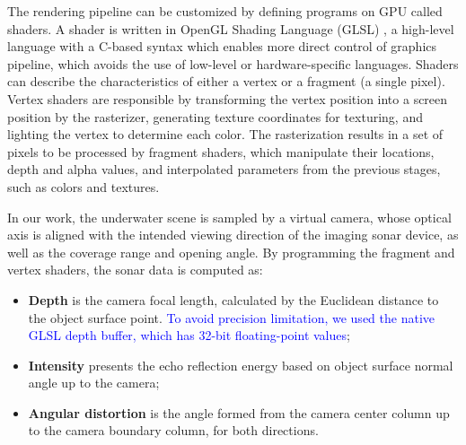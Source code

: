 \documentclass[final,5p,times]{elsarticle}
\begin{document}
The rendering pipeline can be customized by defining programs on GPU called
shaders. A shader is written in OpenGL Shading Language (GLSL) \cite{rost2009}, a high-level language with a C-based syntax which enables more direct control of graphics pipeline, which avoids the use of low-level or hardware-specific languages. Shaders can describe the characteristics of either a vertex or a fragment (a single pixel). Vertex shaders are responsible by transforming the vertex position into a screen position by the rasterizer, generating texture coordinates for texturing, and lighting the vertex to determine each color. The rasterization results in a set of pixels to be processed by fragment shaders, which manipulate their locations, depth and alpha values, and interpolated parameters from the previous stages, such as colors and textures.

In our work, the underwater scene is sampled by a virtual camera, whose
optical axis is aligned with the intended viewing direction of the
imaging sonar device, as well as the coverage range and opening angle.
By programming the fragment and vertex shaders, the sonar data is
computed as:

\begin{itemize}[]
    \item \textbf{Depth} is the camera focal length, calculated by the
    Euclidean distance to the object surface point. \textcolor{blue}{To
    avoid precision limitation, we used the native GLSL depth buffer,
    which has 32-bit floating-point values};
    \item \textbf{Intensity} presents the echo reflection energy based
    on object surface normal angle up to the camera;
    \item \textbf{Angular distortion} is the angle formed from the camera
    center column up to the camera boundary column, for both directions.
\end{itemize}
\end{document}
